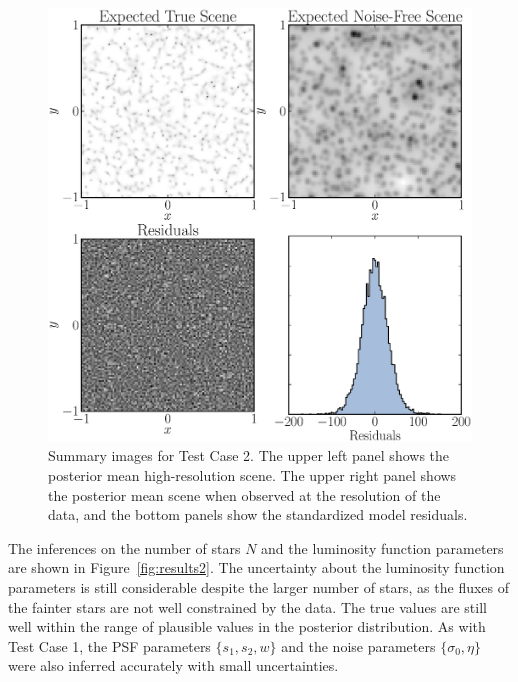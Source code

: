 \documentclass[12pt, preprint]{aastex}
\begin{document}
\begin{figure}[ht!]
\begin{center}
\includegraphics[width=\textwidth]{Figures/summaries.eps}
\end{center}
\caption{Summary images for Test Case 2. The upper left panel shows the posterior
mean high-resolution scene. The upper right panel shows the posterior mean scene
when observed at the resolution of the data, and the bottom panels show the
standardized model residuals.
\label{fig:summaries}}
\end{figure}

The inferences on the number of stars $N$ and the luminosity function parameters
are shown in Figure~\ref{fig:results2}. The uncertainty about the luminosity
function parameters is still considerable despite the larger number of stars, as the fluxes of the fainter stars
are not well constrained by the data. The true values are still well within
the range of plausible values in the posterior distribution.
As with Test Case 1, the PSF parameters $\{s_1, s_2, w\}$ and the noise parameters $\{\sigma_0, \eta\}$ were also inferred accurately with small uncertainties.
\end{document}
